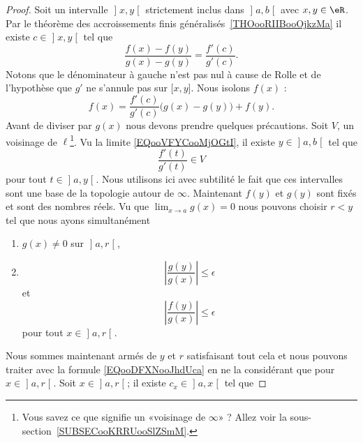 \begin{proof}
Soit un intervalle \( \mathopen] x , y \mathclose[\) strictement inclus dans \( \mathopen] a , b \mathclose[\) avec \( x,y\in\eR\). Par le théorème des accroissements finis généralisés~\ref{THOooRIIBooOjkzMa} il existe \( c\in \mathopen] x , y \mathclose[\) tel que
    \begin{equation}
        \frac{ f(x)-f(y) }{ g(x)-g(y) }=\frac{ f'(c) }{ g'(c) }.
    \end{equation}
    Notons que le dénominateur à gauche n'est pas nul à cause de Rolle et de l'hypothèse que \( g'\) ne s'annule pas sur \( \mathopen[ x , y \mathclose]\). Nous isolons \( f(x)\) :
    \begin{equation}        \label{EQooDFXNooJhdUca}
        f(x)=\frac{ f'(c) }{ g'(c) }\Big( g(x)-g(y) \Big)+f(y).
    \end{equation}
Avant de diviser par \( g(x)\) nous devons prendre quelques précautions. Soit \( V\), un voisinage de \( \ell\)\footnote{Vous savez ce que signifie un «voisinage de \( \infty\)» ? Allez voir la sous-section~\ref{SUBSECooKRRUooSlZSmM}.}. Vu la limite \eqref{EQooVFYCooMjOGtI}, il existe \( y\in \mathopen] a , b \mathclose[\) tel que
    \begin{equation}
        \frac{ f'(t) }{ g'(t) }\in V
    \end{equation}
pour tout \( t\in \mathopen] a , y \mathclose[\). Nous utilisons ici avec subtilité le fait que ces intervalles sont une base de la topologie autour de \( \infty\). Maintenant \( f(y)\) et \( g(y)\) sont fixés et sont des nombres réels. Vu que \( \lim_{x\to a} g(x)=0\) nous pouvons choisir \( r<y\) tel que nous ayons simultanément
    \begin{enumerate}
        \item
        \( g(x)\neq 0\) sur \( \mathopen] a , r \mathclose[\),
        \item
            \begin{equation}
                | \frac{ g(y) }{ g(x) } |\leq \epsilon
            \end{equation}
            et
            \begin{equation}
                | \frac{ f(y) }{ g(x) } |\leq \epsilon
            \end{equation}
        pour tout \( x\in \mathopen] a , r \mathclose[\).
    \end{enumerate}
Nous sommes maintenant armés de \( y\) et \( r\) satisfaisant tout cela et nous pouvons traiter avec la formule \eqref{EQooDFXNooJhdUca} en ne la considérant que pour \( x\in \mathopen] a , r \mathclose[\). Soit \( x\in \mathopen] a , r \mathclose[\); il existe \( c_x\in \mathopen] a , x \mathclose[\) tel que

\end{proof}
